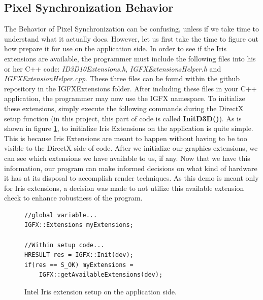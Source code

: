 \documentclass[a4paper, 12pt]{article}
\begin{document}
\subsection{Pixel Synchronization Behavior}

\label{section:PSBehavior}

The Behavior of Pixel Synchronization can be confusing, unless if we take time
to understand what it actually does. However, let us first take the time to
figure out how prepare it for use on the application side. In order to see if
the Iris extensions are available, the programmer must include the following
files into his or her C++ code: \textit{ID3D10Extensions.h},
\textit{IGFXExtensionsHelper.h} and \textit{IGFXExtensionHelper.cpp}. These
three files can be found within the github repository in the IGFXExtensions
folder. After including these files in your C++ application, the programmer
may now use the IGFX namespace. To initialize these extensions, simply execute
the following commands during the DirectX setup function (in this project,
this part of code is called \textbf{InitD3D()}). As is shown in figure
\ref{code:extInit}, to initialize Iris Extensions on the application is quite
simple. This is because Iris Extensions are meant to happen without having to
be too visible to the DirectX side of code. After we initialize our graphics
extensions, we can see which extensions we have available to us, if any. Now
that we have this information, our program can make informed decisions on what
kind of hardware it has at its disposal to accomplish render techniques. As
this demo is meant only for Iris extensions, a decision was made to not
utilize this available extension check to enhance robustness of the program.

\begin{figure}[h]
\begin{lstlisting}
//global variable...
IGFX::Extensions myExtensions;

//Within setup code...
HRESULT res = IGFX::Init(dev);
if(res == S_OK) myExtensions = 
	IGFX::getAvailableExtensions(dev);

\end{lstlisting}
\caption{Intel Iris extension setup on the application side.}
\label{code:extInit}
\end{figure}
\end{document}
